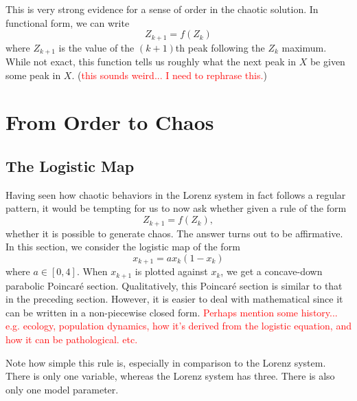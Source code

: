 \documentclass[twocolumn,amsmath,amssymb,aps]{revtex4}
\begin{document}
This is very strong evidence for a sense of order in the chaotic solution. In functional form, we can write
\begin{equation*}
Z_{k+1} = f(Z_k)
\end{equation*}
where $Z_{k+1}$ is the value of the $(k+1)$th peak following the $Z_{k}$ maximum. While not exact, this function tells us roughly what the next peak in $X$ be given some peak in $X$. (\textcolor{red}{this sounds weird... I need to rephrase this.})



\section{From Order to Chaos}
\subsection{The Logistic Map}
Having seen how chaotic behaviors in the Lorenz system in fact follows a regular pattern, it would be tempting for us to now ask whether given a rule of the form 
\begin{equation*}
Z_{k+1} = f(Z_k),
\end{equation*}
whether it is possible to generate chaos. The answer turns out to be affirmative. In this section, we consider the logistic map of the form
\begin{equation*}
x_{k+1} = ax_k(1-  x_k)
\end{equation*}
where $a \in [0,4]$. When $x_{k+1}$ is plotted against $x_{k}$, we get a concave-down parabolic Poincar\'{e} section. Qualitatively, this Poincar\'{e} section is similar to that in the preceding section. However, it is easier to deal with mathematical since it can be written in a non-piecewise 
closed form. \textcolor{red}{Perhaps mention some history... e.g. ecology, population dynamics, how it's derived from the logistic equation, and how it can be pathological. etc.}

Note how simple this rule is, especially in comparison to the Lorenz system. There is only one variable, whereas the Lorenz system has three. There is also only one model parameter. 
\end{document}
